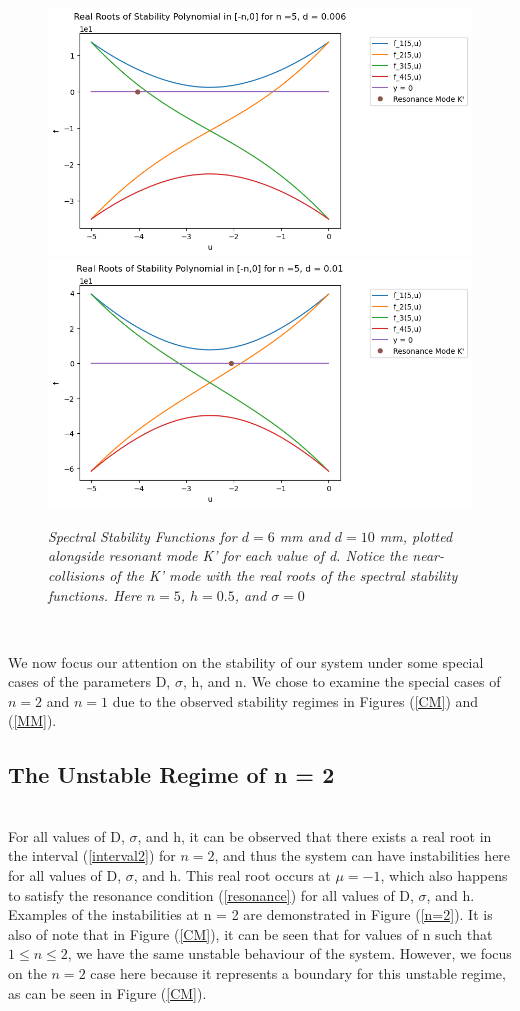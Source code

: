\documentclass{article}
\begin{document}
\begin{figure}[hbt!]
\centering
\includegraphics[width=.8\textwidth]{k2.png}
\includegraphics[width=.8\textwidth]{k6.png}\hfill
\caption{\emph{Spectral Stability Functions for \(d = 6\) mm and \(d = 10\) mm, plotted alongside resonant mode K' for each value of d. Notice the near-collisions of the K' mode with the real roots of the spectral stability functions. Here \(n = 5\), \(h = 0.5\), and \(\sigma = 0\)}} \label{nearres}
\end{figure}
\\

\clearpage


We now focus our attention on the stability of our system under some special cases of the parameters D, \(\sigma\), h, and n. We chose to examine the special cases of \(n=2\) and \(n=1\) due to the observed stability regimes in Figures (\ref{CM}) and (\ref{MM}). 

\subsection{The Unstable Regime of n = 2}
\\

For all values of D, \(\sigma\), and h, it can be observed that there exists a real root in the interval (\ref{interval2}) for \(n = 2\), and thus the system can have instabilities here for all values of D, \(\sigma\), and h. This real root occurs at \(\mu = -1\), which also happens to satisfy the resonance condition (\ref{resonance}) for all values of D, \(\sigma\), and h. Examples of the instabilities at n = 2 are demonstrated in Figure (\ref{n=2}). It is also of note that in Figure (\ref{CM}), it can be seen that for values of n such that \(1 \leq n \leq 2\), we have the same unstable behaviour of the system. However, we focus on the \(n=2\) case here because it represents a boundary for this unstable regime, as can be seen in Figure (\ref{CM}). 
\\
\end{document}
